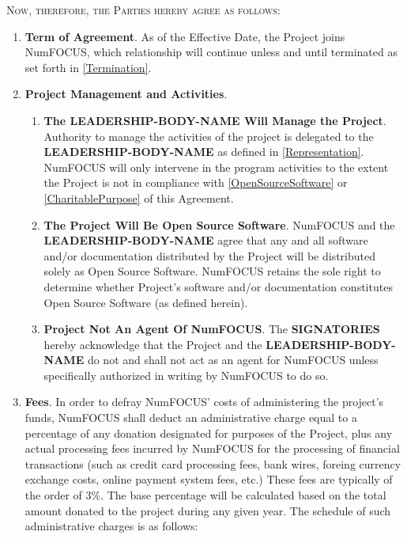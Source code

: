 \documentclass[english,letterpaper,12pt]{article}
\newcommand{\signatories}{\textbf{SIGNATORIES}}
\newcommand{\leadershipbody}{\textbf{LEADERSHIP-BODY-NAME}}
\begin{document}
\medskip{}

\textsc{Now, therefore, the Parties hereby agree as follows:}

\begin{enumerate}[label=\arabic*.,ref=\S~\arabic*]
\item \textbf{Term of Agreement}. As of the Effective Date, the Project
joins NumFOCUS, which relationship will continue unless and until
terminated as set forth in \ref{Termination}. 
\item \textbf{Project Management and Activities}.


\begin{enumerate}[label=\alph*.,ref=\theenumi(\alph*)]

\item \textbf{The \leadershipbody{} Will Manage the
    Project}. \label{ProjectManagement} Authority to manage the activities of
  the project is delegated to the \leadershipbody{} as defined in
  \ref{Representation}.  NumFOCUS will only intervene in the program activities
  to the extent the Project is not in compliance with \ref{OpenSourceSoftware}
  or \ref{CharitablePurpose} of this Agreement.

\item \textbf{The Project Will Be Open Source
  Software}. \label{OpenSourceSoftware} NumFOCUS and the \leadershipbody{}
  agree that any and all software and/or documentation distributed by the
  Project will be distributed solely as Open Source Software.  NumFOCUS retains
  the sole right to determine whether Project's software and/or documentation
  constitutes Open Source Software (as defined herein).
  
\item \textbf{Project Not An Agent Of NumFOCUS}. The \signatories{} hereby
  acknowledge that the Project and the \leadershipbody{} do not and shall not
  act as an agent for NumFOCUS unless specifically authorized in writing by
  NumFOCUS to do so.

\end{enumerate}

\item \textbf{Fees}.  In order to defray NumFOCUS' costs of administering the
  project's funds, NumFOCUS shall deduct an administrative charge equal to a
  percentage of any donation designated for purposes of the Project, plus any
  actual processing fees incurred by NumFOCUS for the processing of financial
  transactions (such as credit card processing fees, bank wires, foreing
  currency exchange costs, online payment system fees, etc.)  These fees are
  typically of the order of 3\%. The base percentage will be calculated based
  on the total amount donated to the project during any given year.  The
  schedule of such administrative charges is as follows:


\end{enumerate}
\end{document}
